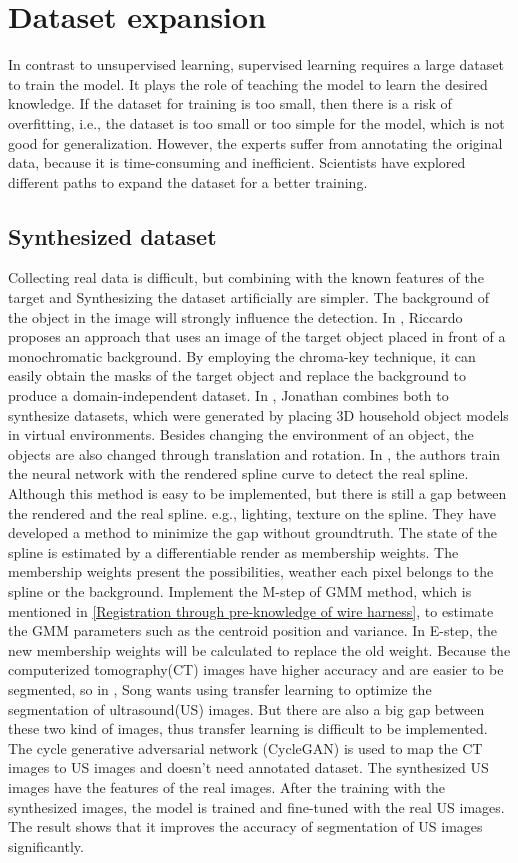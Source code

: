 \section{Dataset expansion}
    In contrast to unsupervised learning, supervised learning requires a large dataset to train the model. It plays the role of teaching the model to learn the desired knowledge.
    If the dataset for training is too small, then there is a risk of overfitting, i.e., the dataset is too small or too simple for the model, which is not good for generalization.
    However, the experts suffer from annotating the original data, because it is time-consuming and inefficient. Scientists have explored different paths to expand the dataset 
    for a better training. 
\subsection{Synthesized dataset}
    Collecting real data is difficult, but combining with the known features of the target and Synthesizing the dataset artificially are simpler. The background of the object in the 
    image will strongly influence the detection. 
    In \cite{9349395}, Riccardo proposes an approach that uses an image of the target object placed in front of a monochromatic background. By employing the chroma-key technique,
    it can easily obtain the masks of the target object and replace the background to produce a domain-independent dataset. In \cite{Tremblay_2018_CVPR_Workshops}, Jonathan combines 
    both to synthesize datasets, which were generated by placing 3D household object models in virtual environments. Besides changing the environment of an object, the objects are 
    also changed through translation and rotation. In \cite{8972568}, the authors train the neural network with the rendered spline curve to detect the real spline. Although this 
    method is easy to be implemented, but there is still a gap between the rendered and the real spline. e.g., lighting, texture on the spline. They have developed a method to minimize
    the gap without groundtruth. The state of the spline is estimated by a differentiable render as membership weights. The membership weights present the possibilities, weather each 
    pixel belongs to the spline or the background. Implement the M-step of GMM method, which is mentioned in \ref{Registration through pre-knowledge of wire harness}, to estimate the 
    GMM parameters such as the centroid position and variance. In E-step, the new membership weights will be calculated to replace the old weight. Because the computerized tomography(CT) 
    images have higher accuracy and are easier to be segmented, so in \cite{SONG2022106706}, Song wants using transfer learning to optimize the segmentation of ultrasound(US) images. But 
    there are also a big gap between these two kind of images, thus transfer learning is difficult to be implemented. The cycle generative adversarial network (CycleGAN) is used to map the 
    CT images to US images and doesn't need annotated dataset. The synthesized US images have the features of the real images. After the training with the synthesized images, the model is 
    trained and fine-tuned with the real US images. The result shows that it improves the accuracy of segmentation of US images significantly. 

